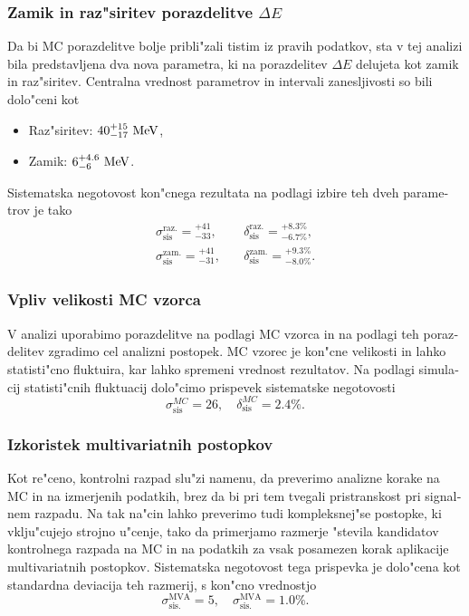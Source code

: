 \begin{otherlanguage}{slovene}
\subsubsection{Zamik in raz"siritev porazdelitve $\Delta E$}

Da bi MC porazdelitve bolje pribli"zali tistim iz pravih podatkov, sta v tej analizi bila predstavljena dva nova parametra, ki na porazdelitev $\Delta E$ delujeta kot zamik in raz"siritev. Centralna vrednost parametrov in intervali zanesljivosti so bili dolo"ceni kot
\begin{itemize}
	\item Raz"siritev: $40_{-17}^{+15}\mathrm{~MeV}$,
	\item Zamik: $6_{-6}^{+4.6}\mathrm{~MeV}$.
\end{itemize}
Sistematska negotovost kon"cnega rezultata na podlagi izbire teh dveh parametrov je tako
\begin{align}
\sigma_{\mathrm{sis}}^{\mathrm{raz.}} = {}^{+41}_{-33},&\quad \delta_{\mathrm{sis}}^{\mathrm{raz.}} = {}^{+8.3\%}_{-6.7\%}, \\
\sigma_{\mathrm{sis}}^{\mathrm{zam.}} = {}^{+41}_{-31},&\quad \delta_{\mathrm{sis}}^{\mathrm{zam.}} = {}^{+9.3\%}_{-8.0\%}.
\end{align}

\subsubsection{Vpliv velikosti MC vzorca}
V analizi uporabimo porazdelitve na podlagi MC vzorca in na podlagi teh porazdelitev zgradimo cel analizni postopek. MC vzorec je kon"cne velikosti in lahko statisti"cno fluktuira, kar lahko spremeni vrednost rezultatov. Na podlagi simulacij statisti"cnih fluktuacij dolo"cimo prispevek sistematske negotovosti
\begin{equation}
\sigma_{\mathrm{sis}}^{MC} = 26,\quad \delta_{\mathrm{sis}}^{MC} = 2.4\%.
\end{equation}


\subsubsection{Izkoristek multivariatnih postopkov}
Kot re"ceno, kontrolni razpad slu"zi namenu, da preverimo analizne korake na MC in na izmerjenih podatkih, brez da bi pri tem tvegali pristranskost pri signalnem razpadu. Na tak na"cin lahko preverimo tudi kompleksnej"se postopke, ki vklju"cujejo strojno u"cenje, tako da primerjamo razmerje "stevila kandidatov kontrolnega razpada na MC in na podatkih za vsak posamezen korak aplikacije multivariatnih postopkov. Sistematska negotovost tega prispevka je dolo"cena kot standardna deviacija teh razmerij, s kon"cno vrednostjo
\begin{equation}
\sigma_{\mathrm{sis.}}^{\mathrm{MVA}} = 5,\quad\sigma_{\mathrm{sis.}}^{\mathrm{MVA}} = 1.0\%.
\end{equation}


\end{otherlanguage}
